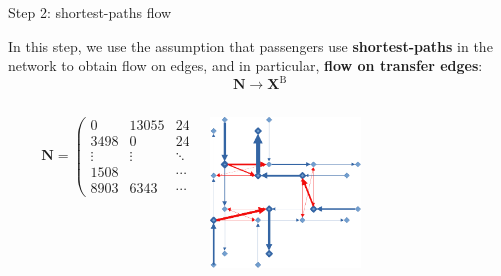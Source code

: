 \documentclass[10pt]{beamer}
\newcommand{\imp}[1]{\textbf{\color{cyan}#1}}
\begin{document}
	\begin{frame}{Step 2: shortest-paths flow}
		
		In this step, we use the assumption that passengers use \imp{shortest-paths} in the network to obtain flow on edges, and in particular, \imp{flow on transfer edges}:
		$$
			\mathbf{N} \longrightarrow \mathbf{X}^\text{B}
		$$ 
		\vspace{0.6cm}
		\begin{columns}
			\small
			\begin{column}{0.7\textwidth}
				$$
				\hspace{1cm} \mathbf{N} = \left( \begin{array}{ccccc}
				0 & 13055 & 243 & \cdots & 144 \\
				3498 & 0 & 24429 & \cdots & 7523 \\
				\vdots & \vdots & \ddots & \ddots & \vdots \\
				1508 &  & \cdots & 0 & 5093 \\
				8903 & 6343 & \cdots & 53 & 0 
				\end{array} \right) \rightarrow 
				$$ 
			\end{column}
			\begin{column}{0.6\textwidth}
				\hspace{0.5cm} \includegraphics[width=0.5\textwidth]{img/flow_computed.png}
			\end{column}
		\end{columns}
	\end{frame}
	
	
\end{document}
